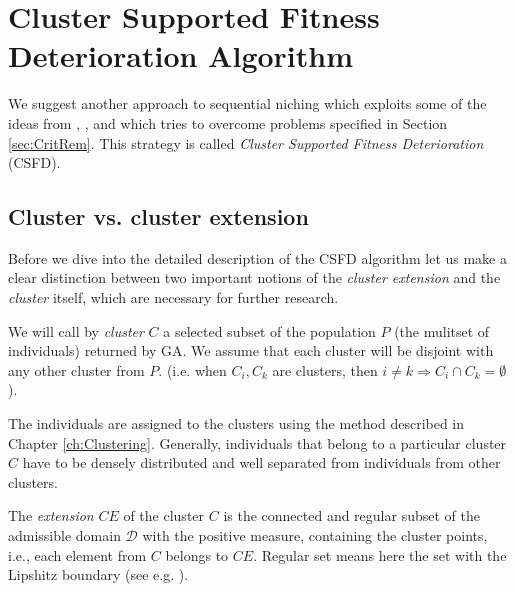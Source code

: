 
\chapter{Cluster Supported Fitness Deterioration Algorithm}
\label{ch:csfdAlgorithm}

We suggest another approach to sequential niching
which exploits some of the ideas from \cite{Obuchowicz1997},
\cite{SchaeferAdamskaTelega2004}, \cite{SchaeferAdamska2004} and which
tries to overcome problems specified in Section \ref{sec:CritRem}.
This strategy is called \textit{Cluster Supported
Fitness Deterioration} (CSFD).

\section{Cluster vs. cluster extension}
\label{sec:ClystvsExt}

Before we dive into the detailed description of the CSFD algorithm
let us make a clear distinction between two important notions of the
\textit{cluster extension} and the \textit{cluster} itself, which are
necessary for further research.

\vspace{5pt}
\begin{definition}
\label{def:cluster}
We will call by \textit{cluster} $C$ a selected subset of the population $P$ 
(the mulitset of individuals) returned by GA.
We assume that each cluster will be disjoint with any other cluster from $P$. 
(i.e. when $C_i, C_k$ are clusters, then
$i \neq k \Longrightarrow C_i \cap C_k = \emptyset$). 
\end{definition}
\vspace{5pt}

The individuals are assigned to the clusters using the method
described in Chapter \ref{ch:Clustering}. 
Generally, individuals that belong to a
particular cluster $C$ have to be densely distributed and well separated from
individuals from other clusters.

\vspace{5pt}
\begin{definition}
\label{def:cluster_extension}
The \textit{extension} $CE$ of the cluster $C$ is the connected and regular 
subset of the admissible domain $\mathcal{D}$
with the positive measure, containing the cluster points, i.e., 
each element from $C$ belongs to $CE$.
Regular set means here the set with the Lipshitz boundary 
(see e.g. \cite{Zeidler1985}).
\end{definition}
\vspace{5pt}

